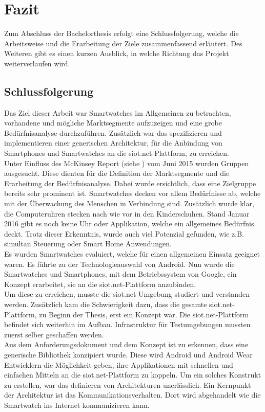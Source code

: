 \chapter{Fazit}
Zum Abschluss der Bachelorthesis erfolgt eine Schlussfolgerung, welche die Arbeitsweise und die Erarbeitung der Ziele zusammenfassend erläutert. Des Weiteren gibt es einen kurzen Ausblick, in welche Richtung das Projekt weiterverlaufen wird.
\section{Schlussfolgerung}
Das Ziel dieser Arbeit war Smartwatches im Allgemeinen zu betrachten, vorhandene und mögliche Marktsegmente aufzuzeigen und eine grobe Bedürfnisanalyse durchzuführen. Zusätzlich war das spezifizieren und implementieren einer generischen Architektur, für die Anbindung von Smartphones und Smartwatches an die siot.net-Plattform, zu erreichen.\\

Unter Einfluss des McKinsey Report (siehe \cite{mk:iot}) vom Juni 2015 wurden Gruppen ausgesucht. Diese dienten für die Definition der Marktsegmente und die Erarbeitung der Bedürfnisanalyse. Dabei wurde ersichtlich, dass eine Zielgruppe bereits sehr prominent ist. Smartwatches decken vor allem Bedürfnisse ab, welche mit der Überwachung des Menschen in Verbindung sind. Zusätzlich wurde klar, die Computeruhren stecken nach wie vor in den Kinderschuhen. Stand Januar 2016 gibt es noch keine Uhr oder Applikation, welche ein allgemeines Bedürfnis deckt. Trotz dieser Erkenntnis, wurde auch viel Potenzial gefunden, wie z.B. simultan Steuerung oder Smart Home Anwendungen.\\

Es wurden Smartwatches evaluiert, welche für einen allgemeinen Einsatz geeignet waren. Es führte zu der Technologieauswahl von Android. Nun wurde die Smartwatches und Smartphones, mit dem Betriebssystem von Google, ein Konzept erarbeitet, sie an die siot.net-Plattform anzubinden.\\

Um diese zu erreichen, musste die siot.net-Umgebung studiert und verstanden werden. Zusätzlich kam die Schwierigkeit dazu, dass die gesamte siot.net-Plattform, zu Beginn der Thesis, erst ein Konzept war. Die siot.net-Plattform befindet sich weiterhin im Aufbau. Infrastruktur für Testumgebungen mussten zuerst selber geschaffen werden.\\

Aus dem Anforderungsdokument und dem Konzept ist zu erkennen, dass eine generische Bibliothek konzipiert wurde. Diese wird Android und Android Wear Entwicklern die Möglichkeit geben, ihre Applikationen mit schnellen und einfachen Mitteln an die siot.net-Plattform zu koppeln. Um ein solches Konstrukt zu erstellen, war das definieren von Architekturen unerlässlich. Ein Kernpunkt der Architektur ist das Kommunikationsverhalten. Dort wird abgehandelt wie die Smartwatch ins Internet kommunizieren kann.\\

